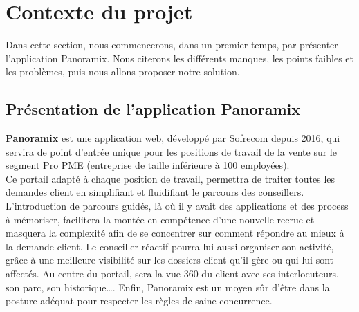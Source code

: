 \section[Contexte du projet]{Contexte du projet}
Dans cette section, nous commencerons, dans un premier temps, par présenter l’application Panoramix. Nous citerons les différents manques, les points faibles et les problèmes, puis nous allons proposer notre solution.
\subsection[Présentation de l’application Panoramix]{Présentation de l’application Panoramix}
\textbf{Panoramix} est une application web, développé par Sofrecom depuis 2016, qui servira de point d'entrée unique pour les positions de travail de la vente sur le segment Pro PME (entreprise de taille inférieure à 100 employées).\\
Ce portail adapté à chaque position de travail, permettra de traiter toutes les demandes client en simplifiant et fluidifiant le parcours des conseillers.\\
L’introduction de parcours guidés, là où il y avait des applications et des process à mémoriser, facilitera la montée en compétence d’une nouvelle recrue et masquera la complexité afin de se concentrer sur comment répondre au mieux à la demande client. Le conseiller réactif pourra lui aussi organiser son activité, grâce à une meilleure visibilité sur les dossiers client qu’il gère ou qui lui sont affectés. Au centre du portail, sera la vue 360 du client avec ses interlocuteurs, son parc, son historique…. 
Enfin, Panoramix est un moyen sûr d’être dans la posture adéquat pour respecter les règles de saine concurrence.
